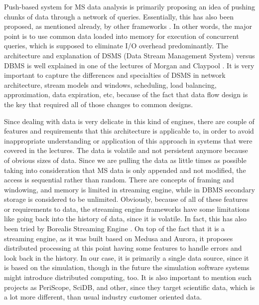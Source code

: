\documentclass[10pt,journal,final,letterpaper,twocolumn]{IEEEtran}
\begin{document}
Push-based system for MS data analysis is primarily proposing an idea of pushing chunks of data through a network of queries. Essentially, this has also been proposed, as mentioned already, by other frameworks \cite{DataPath,Volcano,Qpipe}. In other words, the major point is to use common data loaded into memory for execution of concurrent queries, which is supposed to eliminate I/O overhead predominantly. The architecture and explanation of DSMS (Data Stream Management System) versus DBMS is well explained in one of the lectures of Morgan and Claypool \cite{DataStreamManagement}. It is very important to capture the differences and specialties of DSMS in network architecture, stream models and windows, scheduling, load balancing, approximation, data expiration, etc, because of the fact that data flow design is the key that required all of those changes to common designs.

Since dealing with data is very delicate in this kind of engines, there are couple of features and requirements that this architecture is applicable to, in order to avoid inappropriate understanding or application of this approach in systems that were covered in the lectures\cite{DataStreamManagement}. The data is volatile and not persistent anymore because of obvious sizes of data.  Since we are pulling the data as little times as possible taking into consideration that MS data is only appended and not modified, the access is sequential rather than random. There are concepts of framing and windowing, and memory is limited in streaming engine, while in DBMS secondary storage is considered to be unlimited. Obviously, because of all of these features or requirements to data, the streaming engine frameworks have some limitations like going back into the history of data, since it is volatile. In fact, this has also been tried by Borealis Streaming Engine \cite{borealis}. On top of the fact that it is a streaming engine, as it was built based on Medusa\cite{medusa} and Aurora\cite{aurora}, it proposes distributed processing at this point having some features to handle errors and look back in the history. In our case, it is primarily a single data source, since it is based on the simulation, though in the future the simulation software systems might introduce distributed computing, too. It is also important to mention such projects as PeriScope\cite{PeriScope}, SciDB\cite{SciDB}, and other\cite{SDSS_SIGMOD02,QBISM_ICDE94}, since they target scientific data, which is a lot more different, than usual industry customer oriented data.
\end{document}

